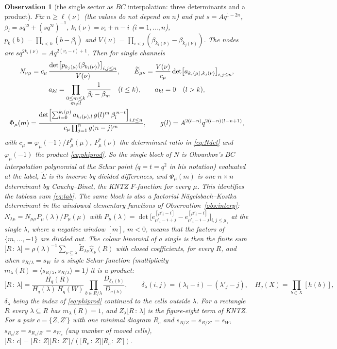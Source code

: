 \documentclass[11pt]{article}
\newtheorem{observation}{Observation}
\newcommand{\Et}{\widetilde{E}}
\newcommand{\chih}{\hat\chi}
\newcommand{\cf}[2]{\bigl[#1\,{:}\,#2\bigr]}
\begin{document}
\begin{observation}[the single sector as $BC$ interpolation: three determinants and a product]\label{obs:bc}
Fix $n\ge\ell(\nu)$ (the values do not depend on $n$) and put $s=Aq^{1-2n}$, $\beta_l=sq^{2l}+(sq^{2l})^{-1}$,
$k_i(\nu)=\nu_i+n-i$ ($i=1,\dots,n$), $p_k(b)=\prod_{l<k}(b-\beta_l)$ and $V(\nu)=\prod_{i<j}(\beta_{k_i(\nu)}-\beta_{k_j(\nu)})$.
The nodes are $sq^{2k_i(\nu)}=Aq^{2(\nu_i-i)+1}$.  Then for single channels
\begin{gather}
N_{\nu\mu}=c_\mu\,\frac{\det\bigl[p_{k_j(\mu)}(\beta_{k_i(\nu)})\bigr]_{i,j\le n}}{V(\nu)},\qquad
\Et_{\mu\nu}=\frac{V(\nu)}{c_\mu}\det\bigl[a_{k_i(\mu),k_j(\nu)}\bigr]_{i,j\le n},\label{eq:Ndet}\\
a_{kl}=\prod_{\substack{0\le m\le k\\ m\ne l}}\frac1{\beta_l-\beta_m}\quad(l\le k),\qquad a_{kl}=0\quad(l>k),\notag\\
\Phi_\mu(m)=\frac{\det\Bigl[\sum_{l=0}^{k_i(\mu)}a_{k_i(\mu),l}\,g(l)^m\,\beta_l^{\,n-t}\Bigr]_{i,t\le n}}
{c_\mu\prod_{j=1}^ng(n-j)^m},\qquad g(l)=A^{2(l-n)}q^{2(l-n)(l-n+1)},\label{eq:Phidet}
\end{gather}
with $c_\mu=\varphi_\mu(-1)/P^*_\mu(\mu)$, $P^*_\mu(\nu)$ the determinant ratio in \eqref{eq:Ndet} and $\varphi_\mu(-1)$ the
product \eqref{eq:phiprod}.  So the single block of $N$ is Okounkov's $BC$ interpolation polynomial at the Schur point
($q=t=q^2$ in his notation) evaluated at the label, $\Et$ is its inverse by divided differences, and $\Phi_\mu(m)$ is one
$n\times n$ determinant by Cauchy--Binet, the KNTZ $F$-function for every $\mu$.  This identifies the tableau sum
\eqref{eq:tab}.  The same block is also a factorial N\"agelsbach--Kostka determinant in the windowed elementary functions
of Observation~\ref{obs:interp}: $N_{\lambda\mu}=N_{\mu\mu}P_\mu(\lambda)/P_\mu(\mu)$ with
$P_\mu(\lambda)=\det\bigl[e^{[\mu'_i-i]}_{\mu'_i-i+j}-e^{[\mu'_i-i]}_{\mu'_i-i-j}\bigr]_{i,j\le\mu_1}$ at the single
$\lambda$, where a negative window $[m]$, $m<0$, means that the factors of $\{m,\dots,-1\}$ are divided out.  The colour binomial of a single is then the finite sum $\cf R\lambda=\rho(\lambda)^{-1}\sum_{\nu\subseteq
\lambda}\Et_{\lambda\nu}\chih_\nu(R)$ with closed coefficients, for every $R$, and when $s_{R/\lambda}=s_W$ is a single
Schur function (multiplicity $m_\lambda(R)=\langle s_{R/\lambda},s_{R/\lambda}\rangle=1$) it is a product:
\begin{equation}\label{eq:colprod}
\cf R\lambda=\frac{H_q(R)}{H_q(\lambda)\,H_q(W)}\prod_{b\in R/\lambda}\frac{D_{\delta_\lambda(b)}}{D_{c(b)}},\qquad
\delta_\lambda(i,j)=(\lambda_i-i)-(\lambda'_j-j),\quad H_q(X)=\prod_{b\in X}[h(b)],
\end{equation}
$\delta_\lambda$ being the index of \eqref{eq:phiprod} continued to the cells outside $\lambda$.  For a rectangle $R$ every
$\lambda\subseteq R$ has $m_\lambda(R)=1$, and $Z_\lambda\cf R\lambda$ is the figure-eight term of KNTZ.  For a pair
$c=\{Z,Z'\}$ with one minimal diagram $R_c$ and $s_{R/Z}=s_{R/Z'}=s_W$, $s_{R_c/Z}=s_{R_c/Z'}=s_{W_c}$ (any number of moved
cells), $\cf Rc=\cf RZ\cf R{Z'}/(\cf{R_c}Z\cf{R_c}{Z'})$.


\end{observation}
\end{document}
